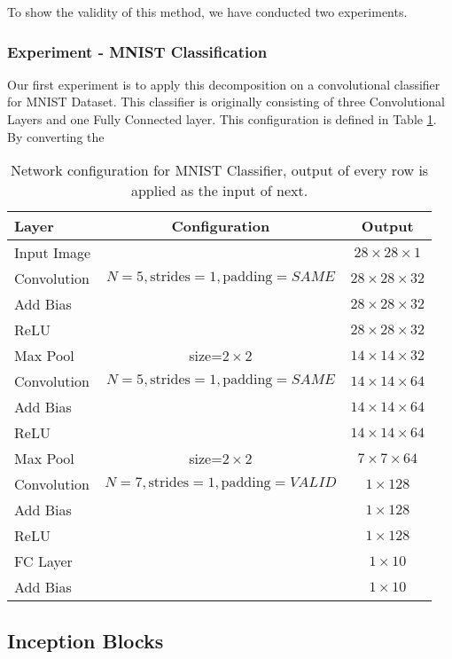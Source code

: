 To show the validity of this method, we have conducted two experiments. 
\subsubsection{Experiment - MNIST Classification}
Our first experiment is to apply this decomposition on a convolutional classifier for MNIST Dataset. This classifier is originally consisting of three Convolutional Layers and one Fully Connected layer. This configuration is defined in Table \ref{tab:nxn-mnist-classifier}. By converting the 
\begin{table}
\centering
\begin{tabular}{l | c | c}
Layer & Configuration & Output\\
\hline
Input Image & & $28 \times 28 \times 1$ \\
\hline
Convolution & \small $N=5, \text{strides}=1, \text{padding}=SAME$ & $28 \times 28 \times 32$ \\
Add Bias & & $28 \times 28 \times 32$ \\
ReLU & & $28 \times 28 \times 32$ \\
Max Pool & size=$ 2 \times 2$ & $14 \times 14 \times 32$ \\
\hline
Convolution & \small $N=5, \text{strides}=1, \text{padding}=SAME$ & $14 \times 14 \times 64$ \\
Add Bias & & $14 \times 14 \times 64$ \\
ReLU & & $14 \times 14 \times 64$ \\
Max Pool & size=$ 2 \times 2$ & $7 \times 7 \times 64$ \\
\hline
Convolution & \small $N=7, \text{strides}=1, \text{padding}=VALID$ & $1 \times 128$ \\
Add Bias & & $ 1 \times 128$ \\
ReLU & & $ 1 \times 128$ \\
\hline
FC Layer &  & $1 \times 10$ \\
Add Bias & & $1 \times 10$ 
\end{tabular}
\caption{Network configuration for MNIST Classifier, output of every row is applied as the input of next.}
\label{tab:nxn-mnist-classifier}
\end{table}

\subsection{Inception Blocks}
